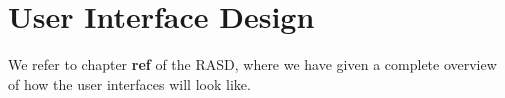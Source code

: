 \chapter{User Interface Design}
We refer to chapter \textbf{ref} of the RASD, where we have given a complete overview of how the user interfaces will look like.
